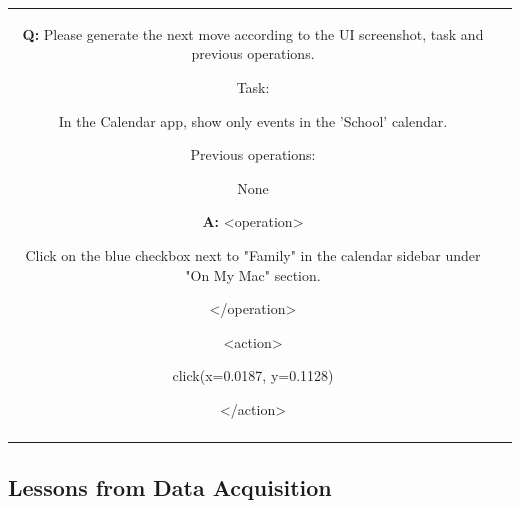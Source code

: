 \begin{table}[h!]
\begin{tabular}{|c|m{8cm}|}
\textbf{Q:}
Please generate the next move according to the UI screenshot, task and previous operations. 

Task: 

In the Calendar app, show only events in the 'School' calendar. 

Previous operations: 

None


\textbf{A:}
\textless operation\textgreater

Click on the blue checkbox next to "Family" in the calendar sidebar under "On My Mac" section.

\textless /operation\textgreater  

\textless action\textgreater 

click(x=0.0187, y=0.1128) 

\textless /action\textgreater 
\\

\mybottomrule

\end{tabular}
\end{table}


\subsection{Lessons from Data Acquisition}
